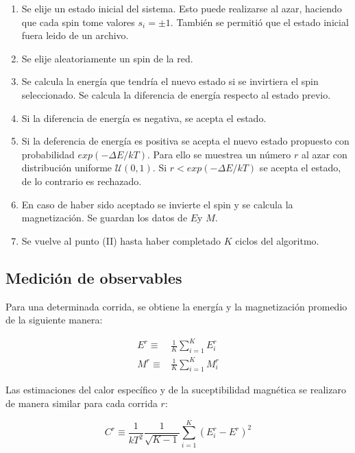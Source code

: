 \documentclass[a4paper,12pt]{article}
\begin{document}
\renewcommand{\theenumi}{\roman{enumi}}
\begin{enumerate}
	\item Se elije un estado inicial del sistema. Esto puede realizarse al 
	azar, haciendo que cada spin tome valores $s_i=\pm1$. También se permitió 
	que el estado inicial fuera leido de un archivo.
	\item Se elije aleatoriamente un spin de la red.
	\item Se calcula la energía que tendría el nuevo estado si se invirtiera el 
	spin seleccionado. Se calcula la diferencia de energía respecto al estado 
	previo.
	\item Si la diferencia de energía es negativa, se acepta el estado. 
	\item Si la deferencia de energía es positiva se acepta el nuevo estado 
	propuesto con probabilidad $exp(-\Delta E/kT)$. Para ello se muestrea un 
	número $r$ al azar con distribución uniforme $\mathcal{U}(0,1)$. Si $r< 
	exp(-\Delta E/kT)$ se acepta el estado, de lo contrario es rechazado.
    \item En caso de haber sido aceptado se invierte el spin y se 
    calcula la magnetización. Se guardan los datos de $E$y $M$.
    \item Se vuelve al punto (\textrm{II}) hasta haber completado $K$ ciclos 
    del 
    algoritmo.
\end{enumerate}

\subsection{Medición de observables}

Para una determinada corrida, se obtiene la energía y la magnetización promedio 
de la siguiente manera:

\begin{subequations}
   \begin{align}
  E^r \equiv &\frac{1}{K}\sum_{i=1}^K E^r_i 
  \label{eq:E_prom}\\
  M^r \equiv & \frac{1}{K}\sum_{i=1}^K M^r_i 
  \label{eq:M_prom}
   \end{align}
\end{subequations}

Las estimaciones del calor específico y de la suceptibilidad magnética se 
realizaro de manera similar para cada corrida $r$:

\begin{equation}
 C^r \equiv  \frac{1}{kT^2} \frac{1}{\sqrt{K-1}} \sum_{i=1}^K \left(
 E_i^r - E^r \right)^2
\end{equation}
\end{document}
